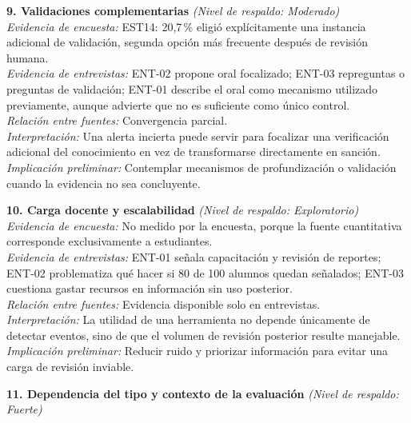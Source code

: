 \begin{center}
\begin{infobox}
\end{infobox}
\vspace{2pt}
\begin{infobox}
\textbf{\textcolor{accent}{9. Validaciones complementarias}} \textit{(Nivel de respaldo: Moderado)}\\
\textit{Evidencia de encuesta:} EST14: 20,7\,\% eligió explícitamente una instancia adicional de validación, segunda opción más frecuente después de revisión humana.\\
\textit{Evidencia de entrevistas:} ENT-02 propone oral focalizado; ENT-03 repreguntas o preguntas de validación; ENT-01 describe el oral como mecanismo utilizado previamente, aunque advierte que no es suficiente como único control.\\
\textit{Relación entre fuentes:} Convergencia parcial.\\
\textit{Interpretación:} Una alerta incierta puede servir para focalizar una verificación adicional del conocimiento en vez de transformarse directamente en sanción.\\
\textit{Implicación preliminar:} Contemplar mecanismos de profundización o validación cuando la evidencia no sea concluyente.
\end{infobox}
\vspace{2pt}
\begin{infobox}
\textbf{\textcolor{accent}{10. Carga docente y escalabilidad}} \textit{(Nivel de respaldo: Exploratorio)}\\
\textit{Evidencia de encuesta:} No medido por la encuesta, porque la fuente cuantitativa corresponde exclusivamente a estudiantes.\\
\textit{Evidencia de entrevistas:} ENT-01 señala capacitación y revisión de reportes; ENT-02 problematiza qué hacer si 80 de 100 alumnos quedan señalados; ENT-03 cuestiona gastar recursos en información sin uso posterior.\\
\textit{Relación entre fuentes:} Evidencia disponible solo en entrevistas.\\
\textit{Interpretación:} La utilidad de una herramienta no depende únicamente de detectar eventos, sino de que el volumen de revisión posterior resulte manejable.\\
\textit{Implicación preliminar:} Reducir ruido y priorizar información para evitar una carga de revisión inviable.
\end{infobox}
\vspace{2pt}
\begin{infobox}
\textbf{\textcolor{accent}{11. Dependencia del tipo y contexto de la evaluación}} \textit{(Nivel de respaldo: Fuerte)}\\

\end{infobox}
\end{center}
